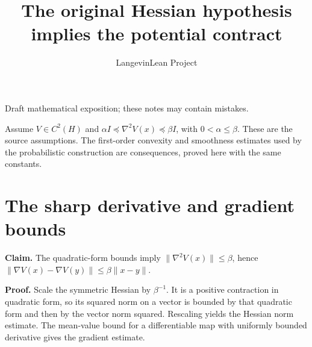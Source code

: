 \documentclass[11pt,a4paper]{article}
\title{\texorpdfstring{The original Hessian hypothesis implies the potential contract}{The original Hessian hypothesis implies the potential contract}}
\author{LangevinLean Project}
\date{}
\begin{document}
\maketitle
Draft mathematical exposition; these notes may contain mistakes.


Assume \(V\in C^2(H)\) and \(\alpha I\preceq\nabla^2V(x)\preceq\beta I\), with \(0<\alpha\le\beta\). These are the source assumptions. The first-order convexity and smoothness estimates used by the probabilistic construction are consequences, proved here with the same constants.


\section{\texorpdfstring{The sharp derivative and gradient bounds}{The sharp derivative and gradient bounds}}


\textbf{Claim.} The quadratic-form bounds imply \(\|\nabla^2V(x)\|\le\beta\), hence \(\|\nabla V(x)-\nabla V(y)\|\le\beta\|x-y\|\).



\textbf{Proof.} Scale the symmetric Hessian by \(\beta^{-1}\). It is a positive contraction in quadratic form, so its squared norm on a vector is bounded by that quadratic form and then by the vector norm squared. Rescaling yields the Hessian norm estimate. The mean-value bound for a differentiable map with uniformly bounded derivative gives the gradient estimate.
\end{document}
